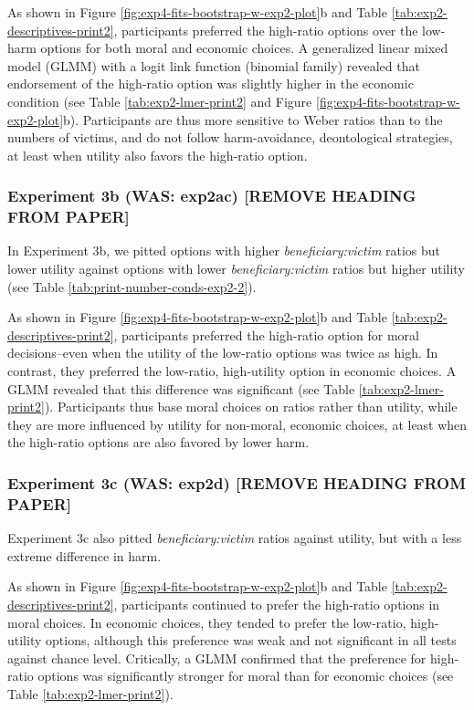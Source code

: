 \documentclass[
]{article}
\begin{document}
As shown in Figure \ref{fig:exp4-fits-bootstrap-w-exp2-plot}b and Table \ref{tab:exp2-descriptives-print2}, participants preferred the high-ratio options over the low-harm options for both moral and economic choices. A generalized linear mixed model (GLMM) with a logit link function (binomial family) revealed that endorsement of the high-ratio option was slightly higher in the economic condition (see Table \ref{tab:exp2-lmer-print2} and Figure \ref{fig:exp4-fits-bootstrap-w-exp2-plot}b). Participants are thus more sensitive to Weber ratios than to the numbers of victims, and do not follow harm-avoidance, deontological strategies, at least when utility also favors the high-ratio option.

\subsubsection{Experiment 3b (WAS: exp2ac) {[}REMOVE HEADING FROM PAPER{]}}\label{experiment-3b-was-exp2ac-remove-heading-from-paper}

In Experiment 3b, we pitted options with higher \emph{beneficiary:victim} ratios but lower utility against options with lower \emph{beneficiary:victim} ratios but higher utility (see Table \ref{tab:print-number-conds-exp2-2}).

As shown in Figure \ref{fig:exp4-fits-bootstrap-w-exp2-plot}b and Table \ref{tab:exp2-descriptives-print2}, participants preferred the high-ratio option for moral decisions--even when the utility of the low-ratio options was twice as high. In contrast, they preferred the low-ratio, high-utility option in economic choices. A GLMM revealed that this difference was significant (see Table \ref{tab:exp2-lmer-print2}). Participants thus base moral choices on ratios rather than utility, while they are more influenced by utility for non-moral, economic choices, at least when the high-ratio options are also favored by lower harm.

\subsubsection{Experiment 3c (WAS: exp2d) {[}REMOVE HEADING FROM PAPER{]}}\label{experiment-3c-was-exp2d-remove-heading-from-paper}

Experiment 3c also pitted \emph{beneficiary:victim} ratios against utility, but with a less extreme difference in harm.

As shown in Figure \ref{fig:exp4-fits-bootstrap-w-exp2-plot}b and Table \ref{tab:exp2-descriptives-print2}, participants continued to prefer the high-ratio options in moral choices. In economic choices, they tended to prefer the low-ratio, high-utility options, although this preference was weak and not significant in all tests against chance level. Critically, a GLMM confirmed that the preference for high-ratio options was significantly stronger for moral than for economic choices (see Table \ref{tab:exp2-lmer-print2}).
\end{document}
